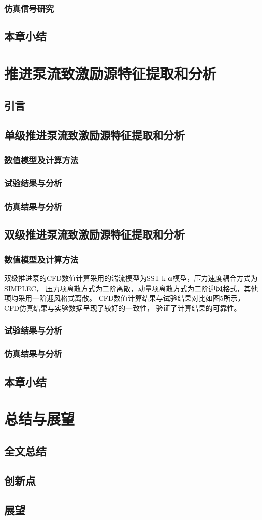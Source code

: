 \subsection{仿真信号研究}
\section{本章小结}


\chapter{推进泵流致激励源特征提取和分析}
\section{引言}
\section{单级推进泵流致激励源特征提取和分析}
\subsection{数值模型及计算方法}

\subsection{试验结果与分析}
\subsection{仿真结果与分析}
\section{双级推进泵流致激励源特征提取和分析}
\subsection{数值模型及计算方法}
双级推进泵的CFD数值计算采用的湍流模型为SST k-ω模型，压力速度耦合方式为SIMPLEC，
压力项离散方式为二阶离散，动量项离散方式为二阶迎风格式，其他项均采用一阶迎风格式离散。
CFD数值计算结果与试验结果对比如图5所示，CFD仿真结果与实验数据呈现了较好的一致性，
验证了计算结果的可靠性。
\subsection{试验结果与分析}
\subsection{仿真结果与分析}
\section{本章小结}

\chapter{总结与展望}
\section{全文总结}
\section{创新点}
\section{展望}
